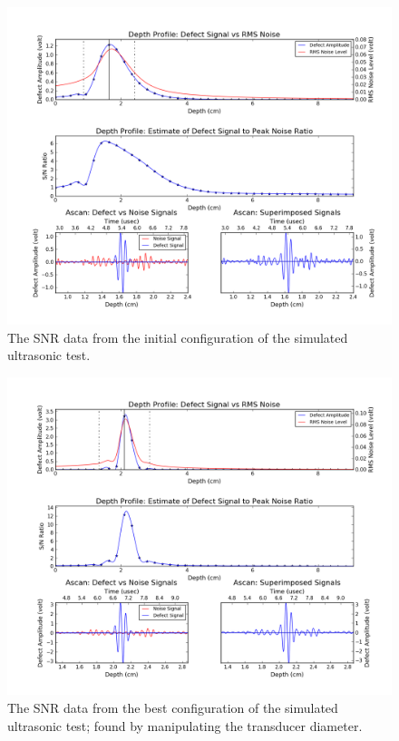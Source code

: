 \documentclass[12 pt]{report}
\begin{document}
\begin{figure}[htbp]
	\centering
	\includegraphics[width=6in]{images/graphs/simulated ultrasonic testing/s4_g2_i1_1}
	\caption{The SNR data from the initial configuration of the simulated ultrasonic test.}
	\label{fig:sut_1}
\end{figure}

\begin{figure}[htbp]
	\centering
	\includegraphics[width=6in]{images/graphs/simulated ultrasonic testing/s4_g2_i1_7}
	\caption{The SNR data from the best configuration of the simulated ultrasonic test; found by manipulating the transducer diameter.}
	\label{fig:sut_2}
\end{figure}
\end{document}
